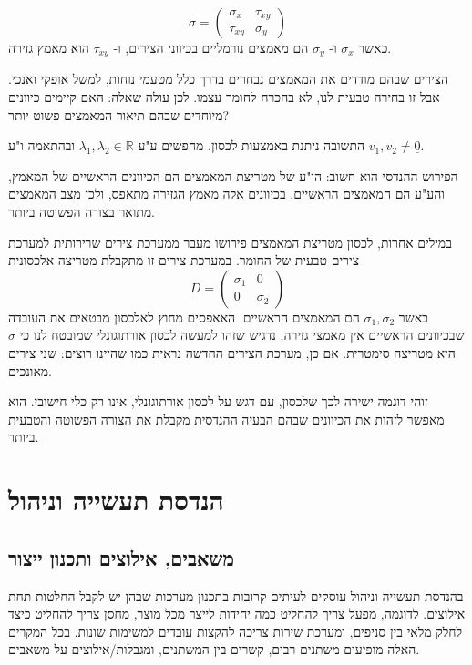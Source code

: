 \documentclass[12pt]{report}
\theoremstyle{plain}
\theoremstyle{definition}
\newcommand{\R}{\mathbb{R}}
\newcommand{\0}{\mathbf{0}}
\begin{document}
$$
\sigma =
\begin{pmatrix}
\sigma_x & \tau_{xy} \\
\tau_{xy} & \sigma_y
\end{pmatrix}
$$
כאשר
$\sigma_x$
ו-
$\sigma_y$
הם מאמצים נורמליים בכיווני הצירים, ו-
$\tau_{xy}$
הוא מאמץ גזירה.

הצירים שבהם מודדים את המאמצים נבחרים בדרך כלל מטעמי נוחות, למשל אופקי ואנכי.
אבל זו בחירה טבעית לנו, לא בהכרח לחומר עצמו.
לכן עולה שאלה: האם קיימים כיוונים מיוחדים שבהם תיאור המאמצים פשוט יותר?

התשובה ניתנת באמצעות לכסון. מחפשים ע"ע
$\lambda_1,\lambda_2\in\R$
ובהתאמה ו"ע
$v_1,v_2\neq\underline{0}$.

הפירוש ההנדסי הוא חשוב:
הו"ע של מטריצת המאמצים הם הכיוונים הראשיים של המאמץ, והע"ע הם המאמצים הראשיים.
בכיוונים אלה מאמץ הגזירה מתאפס, ולכן מצב המאמצים מתואר בצורה הפשוטה ביותר.

במילים אחרות, לכסון מטריצת המאמצים פירושו מעבר ממערכת צירים שרירותית למערכת צירים טבעית של החומר.
במערכת צירים זו מתקבלת מטריצה אלכסונית
$$
D=
\begin{pmatrix}
\sigma_1 & 0 \\
0 & \sigma_2
\end{pmatrix}
$$
כאשר
$\sigma_1, \sigma_2$
הם המאמצים הראשיים. האאפסים מחוץ לאלכסון מבטאים את העובדה שבכיוונים הראשיים אין מאמצי גזירה. נדגיש שזהו למעשה לכסון אורתוגונלי שמובטח לנו כי 
$\sigma$
היא מטריצה סימטרית. אם כן, מערכת הצירים החדשה נראית כמו שהיינו רוצים: שני צירים מאונכים.

זוהי דוגמה ישירה לכך שלכסון, עם דגש על לכסון אורתוגונלי, אינו רק כלי חישובי.
הוא מאפשר לזהות את הכיוונים שבהם הבעיה ההנדסית מקבלת את הצורה הפשוטה והטבעית ביותר.

\section{הנדסת תעשייה וניהול}

\subsection*{משאבים, אילוצים ותכנון ייצור}

בהנדסת תעשייה וניהול עוסקים לעיתים קרובות בתכנון מערכות שבהן יש לקבל החלטות תחת אילוצים.
לדוגמה, מפעל צריך להחליט כמה יחידות לייצר מכל מוצר, מחסן צריך להחליט כיצד לחלק מלאי בין סניפים, ומערכת שירות צריכה להקצות עובדים למשימות שונות.
בכל המקרים האלה מופיעים משתנים רבים, קשרים בין המשתנים, ומגבלות/אילוצים על משאבים.
\end{document}
